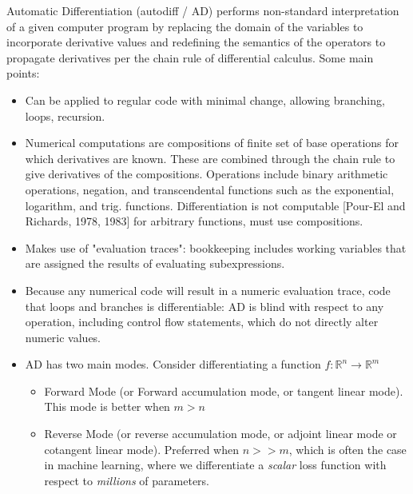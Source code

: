 \documentclass[11pt]{article}
\theoremstyle{definition}
\theoremstyle{plain}
\renewcommand{\b}[1]{\mathbb{#1}}
\begin{document}
\noindent Automatic Differentiation (autodiff / AD) 
performs non-standard interpretation of a given computer program
by replacing the domain of the variables to incorporate derivative values
and redefining the semantics of the operators to propagate derivatives
per the chain rule of differential calculus. Some main points:

\begin{itemize}

\item Can be applied to regular code with minimal change,
allowing branching, loops, recursion. 

\item Numerical computations are compositions of finite set of base operations for 
which derivatives are known. These are combined through the chain rule to give derivatives of the compositions.
Operations include binary arithmetic operations, negation,
and transcendental functions such as the exponential, logarithm, and trig. functions.
Differentiation is not computable [Pour-El and Richards, 1978, 1983] for arbitrary functions, must use compositions.

\item Makes use of "evaluation traces": bookkeeping includes working variables that are assigned
the results of evaluating subexpressions. 

\item Because any numerical code will result in a numeric evaluation trace, 
code that loops and branches is differentiable: AD is blind with respect to any 
operation, including control flow statements, which do not directly alter numeric values.

\item AD has two main modes. Consider differentiating a function 
$f: \b{R}^n \rightarrow \b{R}^m$
    \begin{itemize}
        \item Forward Mode (or Forward
        accumulation mode, or tangent linear mode).
        This mode is better when $m > n$     

        \item Reverse Mode (or reverse accumulation mode,
        or adjoint linear mode or cotangent linear mode).
        Preferred when $n >> m$, which is often
        the case in machine learning, where we differentiate a \textit{scalar} 
        loss function with respect to \textit{millions} of parameters.
    \end{itemize}
\end{itemize}
\end{document}
